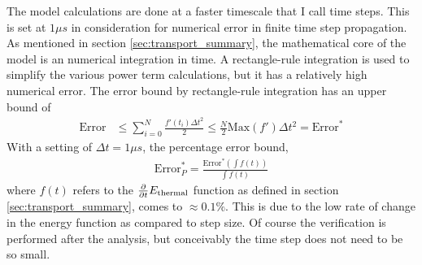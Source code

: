 The model calculations are done at a faster timescale that I call time steps. This is set at $1\mu s$ in consideration for numerical error in finite time step propagation. As mentioned in section \ref{sec:transport_summary}, the mathematical core of the model is an numerical integration in time. A rectangle-rule integration is used to simplify the various power term calculations, but it has a relatively high numerical error. The error bound by rectangle-rule integration has an upper bound of 
\begin{align}
    \text{Error} &\leq \sum_{i = 0}^{N} \frac{f'(t_i)\Delta t^2}{2} \leq \frac{N}{2}\text{Max}(f')\Delta t^2 = \text{Error}^*
\end{align}
With a setting of $\Delta t = 1\mu s$, the percentage error bound,
\begin{align}
    \text{Error}^*_P = \frac{\text{Error}^*(\int f(t))}{\int f(t)}
\end{align}
where $f(t)$ refers to the $\frac{\partial}{\partial t} E_{\text{thermal}}$ function as defined in section \ref{sec:transport_summary}, comes to $\approx 0.1\%$. This is due to the low rate of change in the energy function as compared to step size. Of course the verification is performed after the analysis, but conceivably the time step does not need to be so small. 






